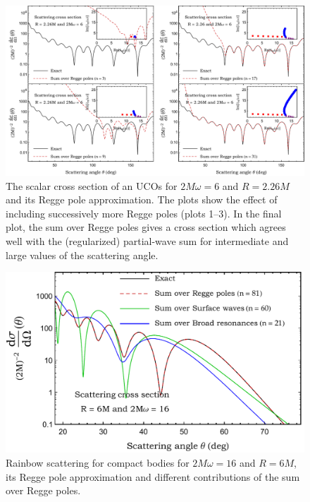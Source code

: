 \documentclass[aps,prd,longbibliography,reprint,twocolumn,amsmath,amssymb,amsfonts,showpacs,footnote,superscriptaddress]{revtex4-1}%
\begin{document}
\begin{figure}[htp!]
\centering
 \includegraphics[scale=0.50]{Scattering_Cross_Section_R_2-dot-26_2Mw_6}
  \vspace*{-0.45cm}
\caption{\label{S_0_R_2-dot-26_2Mw_6_Exact_vs_CAM} The scalar cross section of an UCOs for $2M\omega=6$ and $R=2.26M$ and its Regge pole approximation. The plots show the effect of including successively more Regge poles (plots 1--3). In the final plot, the sum over Regge poles gives a cross section which agrees well with the (regularized) partial-wave sum for intermediate and large values of the scattering angle.}
\end{figure}

\begin{figure}[htp!]
\centering
 \includegraphics[scale=0.50]{Rainbow_Cross_Section_R_6_2Mw_16}
  \vspace*{-0.45cm}
\caption{\label{Rainbow_Cross_Section_R_6_2Mw_16} Rainbow scattering for compact bodies for $2M\omega=16$ and $R=6M$, its Regge pole approximation and different contributions of the sum over Regge poles.}
\end{figure}
\end{document}
